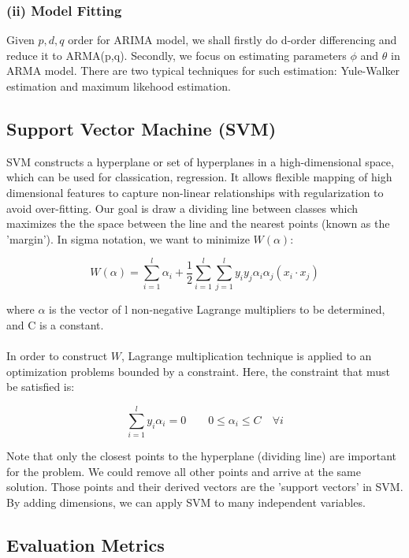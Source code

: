 \documentclass[11pt,a4paper]{article}
\begin{document}
\subsubsection*{(ii) Model Fitting}
Given $p,d,q$ order for ARIMA model, we shall firstly do d-order differencing and reduce it to ARMA(p,q). Secondly, we focus on estimating parameters $\phi$ and $\theta$ in ARMA model. There are two typical techniques for such estimation: Yule-Walker estimation and maximum likehood estimation.

\subsection*{Support Vector Machine (SVM)}

SVM constructs a hyperplane or set of hyperplanes in a high-dimensional space, which can be used for classication, regression. It allows flexible mapping of high dimensional features to capture non-linear relationships with regularization to avoid over-fitting. Our goal is draw a dividing line between classes which maximizes the the space between the line and the nearest points (known as the 'margin'). In sigma notation, we want to minimize $W(\alpha)$:

$$ W(\alpha) = \sum_{i=1}^l \alpha_i +
    \frac{1}{2} \sum_{i=1}^l \sum_{j=1}^l y_i y_j \alpha_i \alpha_j (x_i \cdot  x_j) $$

\noindent
where $\alpha$ is the vector of l non-negative Lagrange multipliers to be determined, and C is a constant. \\ \\ In order to construct $W$, Lagrange multiplication technique is applied to an optimization problems bounded by a constraint. Here, the constraint that must be satisfied is:

$$ \sum_{i=1}^l y_i \alpha_i = 0 \qquad 0 \le \alpha_i \le C \quad \forall i$$

\noindent
Note that only the closest points to the hyperplane (dividing line) are important for the problem. We could remove all other points and arrive at the same solution. Those points and their derived vectors are the 'support vectors' in SVM. By adding dimensions, we can apply SVM to many independent variables.


\subsection*{Evaluation Metrics}
\end{document}
